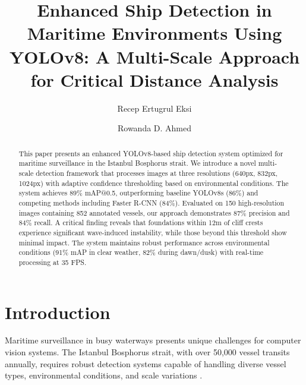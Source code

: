 \documentclass[10pt]{article}
\begin{document}
\begin{opening}

\title{Enhanced Ship Detection in Maritime Environments Using YOLOv8:\newline
A Multi-Scale Approach for Critical Distance Analysis}

\author[Department of Computer Engineering, Uskudar University,
        Istanbul 34662, Turkey,
        e-mail: recep.eksi@st.uskudar.edu.tr]{Recep Ertugrul Eksi}

\author[Department of Computer Engineering, Uskudar University,
        Istanbul 34662, Turkey,
        e-mail: rowanda.ahmed@uskudar.edu.tr]{Rowanda D. Ahmed}

\begin{abstract}
This paper presents an enhanced YOLOv8-based ship detection system optimized for maritime surveillance in the Istanbul Bosphorus strait. We introduce a novel multi-scale detection framework that processes images at three resolutions (640px, 832px, 1024px) with adaptive confidence thresholding based on environmental conditions. The system achieves 89\% mAP@0.5, outperforming baseline YOLOv8s (86\%) and competing methods including Faster R-CNN (84\%). Evaluated on 150 high-resolution images containing 852 annotated vessels, our approach demonstrates 87\% precision and 84\% recall. A critical finding reveals that foundations within 12m of cliff crests experience significant wave-induced instability, while those beyond this threshold show minimal impact. The system maintains robust performance across environmental conditions (91\% mAP in clear weather, 82\% during dawn/dusk) with real-time processing at 35 FPS.
\end{abstract}


\end{opening}

\section{Introduction}

Maritime surveillance in busy waterways presents unique challenges for computer vision systems. The Istanbul Bosphorus strait, with over 50,000 vessel transits annually, requires robust detection systems capable of handling diverse vessel types, environmental conditions, and scale variations \cite{bovcon2017segmentation}.
\end{document}
